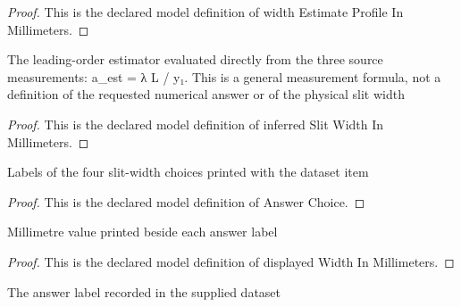\begin{proof}
  This is the declared model definition of width Estimate Profile In Millimeters.
\end{proof}
\begin{definition}
  \label{def:physics:phyx-mini-0249:phyxminiproblems-problemphyxmini0249-inferredslitwidthinmillimeters}
  The leading-order estimator evaluated directly from the three source measurements: a\_est = λ L / y₁. This is a general measurement formula, not a definition of the requested numerical answer or of the physical slit width
\end{definition}
\begin{proof}
  This is the declared model definition of inferred Slit Width In Millimeters.
\end{proof}
\begin{definition}
  \label{def:physics:phyx-mini-0249:phyxminiproblems-problemphyxmini0249-answerchoice}
  Labels of the four slit-width choices printed with the dataset item
\end{definition}
\begin{proof}
  This is the declared model definition of Answer Choice.
\end{proof}
\begin{definition}
  \label{def:physics:phyx-mini-0249:phyxminiproblems-problemphyxmini0249-displayedwidthinmillimeters}
  Millimetre value printed beside each answer label
\end{definition}
\begin{proof}
  This is the declared model definition of displayed Width In Millimeters.
\end{proof}
\begin{definition}
  \label{def:physics:phyx-mini-0249:phyxminiproblems-problemphyxmini0249-recordeddatasetanswer}
  The answer label recorded in the supplied dataset
\end{definition}
